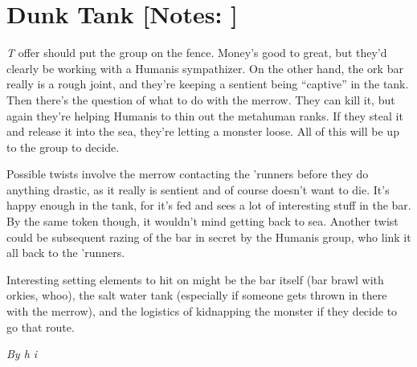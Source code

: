 \documentclass[letterpaper,twocolumn,10.5pt]{article}
\newenvironment{scenario}[6]
	{
		\section{#1 {\small[#2]}}
		\textit{#3}
		\def\TMPSCENARIO{#4 #5}
	}
	{\small\textit{By \TMPSCENARIO}}
\newcommand{\notes}{\textbf{Notes: }}
\begin{document}
\begin{scenario}{Dunk Tank}
\notes  This offer should put the group on the fence. Money's good to great, but they'd clearly be working with a Humanis sympathizer. On the other hand, the ork bar really is a rough joint, and they're keeping a sentient being ``captive'' in the tank. Then there's the question of what to do with the merrow. They can kill it, but again they're helping Humanis to thin out the metahuman ranks. If they steal it and release it into the sea, they're letting a monster loose. All of this will be up to the group to decide.

Possible twists involve the merrow contacting the 'runners before they do anything drastic, as it really is sentient and of course doesn't want to die. It's happy enough in the tank, for it's fed and sees a lot of interesting stuff in the bar. By the same token though, it wouldn't mind getting back to sea. Another twist could be subsequent razing of the bar in secret by the Humanis group, who link it all back to the 'runners.

Interesting setting elements to hit on might be the bar itself (bar brawl with orkies, whoo), the salt water tank (especially if someone gets thrown in there with the merrow), and the logistics of kidnapping the monster if they decide to go that route. 

\end{scenario}
\end{document}
